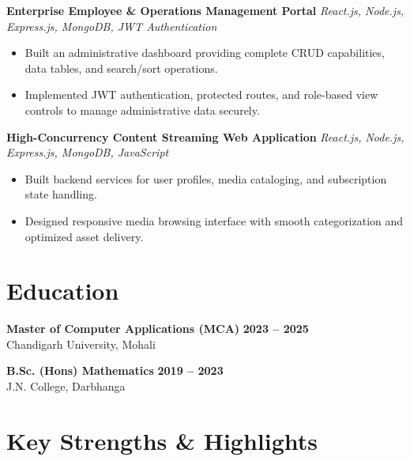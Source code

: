 \documentclass[a4paper,10pt]{article}
\begin{document}
\textbf{Enterprise Employee \& Operations Management Portal}
\hfill
\textit{React.js, Node.js, Express.js, MongoDB, JWT Authentication}

\begin{itemize}

    \item Built an administrative dashboard providing complete CRUD capabilities, data tables, and search/sort operations.

    \item Implemented JWT authentication, protected routes, and role-based view controls to manage administrative data securely.

\end{itemize}


\textbf{High-Concurrency Content Streaming Web Application}
\hfill
\textit{React.js, Node.js, Express.js, MongoDB, JavaScript}

\begin{itemize}

    \item Built backend services for user profiles, media cataloging, and subscription state handling.

    \item Designed responsive media browsing interface with smooth categorization and optimized asset delivery.

\end{itemize}

\section*{Education}

\textbf{Master of Computer Applications (MCA)}
\hfill
\textbf{2023 -- 2025}
\\
Chandigarh University, Mohali

\vspace{3pt}

\textbf{B.Sc. (Hons) Mathematics}
\hfill
\textbf{2019 -- 2023}
\\
J.N. College, Darbhanga

\section*{Key Strengths \& Highlights}
\end{document}
